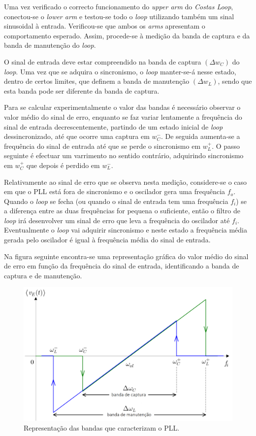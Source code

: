 \documentclass[11pt]{article}
\numberwithin{equation}{section}
\begin{document}
{Uma vez verificado o correcto funcionamento do \textit{upper arm} do \textit{Costas Loop}, conectou-se o \textit{lower arm} e testou-se todo o \textit{loop} utilizando também um sinal sinusoidal à entrada. Verificou-se que ambos os \textit{arms} apresentam o comportamento esperado. Assim, procede-se à medição da banda de captura e da banda de manutenção do \textit{loop}.

O sinal de entrada deve estar compreendido na banda de captura $\left(\Delta w_{C}\right)$ do \textit{loop}. Uma vez que se adquira o sincronismo, o \textit{loop} manter-se-á nesse estado, dentro de certos limites, que definem a banda de manutenção $\left(\Delta w_{L}\right)$, sendo que esta banda pode ser diferente da banda de captura. 

Para se calcular experimentalmente o valor das bandas é necessário observar o valor médio do sinal de erro, enquanto se faz variar lentamente a frequência do sinal de entrada decrescentemente, partindo de um estado inicial de \textit{loop} dessincronizado, até que ocorre uma captura em $w_{C}^{-}$. De seguida aumenta-se a frequência do sinal de entrada até que se perde o sincronismo em $w_{L}^{+}$. O passo seguinte é efectuar um varrimento no sentido contrário, adquirindo sincronismo em $w_{C}^{+}$ que depois é perdido em $w_{L}^{-}$.

Relativamente ao sinal de erro que se observa nesta medição, considere-se o caso em que o PLL está fora de sincronismo e o oscilador gera uma frequência $f_o$. Quando o \textit{loop} se fecha (ou quando o sinal de entrada tem uma frequência $f_i$) se a diferença entre as duas frequências for pequena o suficiente, então o filtro de  \textit{loop} irá desenvolver um sinal de erro que leva a frequência do oscilador até $f_i$. Eventualmente o \textit{loop} vai adquirir sincronismo e neste estado a frequência média gerada pelo oscilador é igual à frequência média do sinal de entrada.

Na figura seguinte encontra-se uma representação gráfica do valor médio do sinal de erro em função da frequência do sinal de entrada, identificando a banda de captura e de manutenção.

\begin{figure}[H]
	\centering
	\includegraphics[keepaspectratio=true, scale=0.25]{teoricas/malhas}
	\caption{Representação das bandas que caracterizam o PLL.}
	\vspace{-0.8em}
\end{figure} 

}
\end{document}
